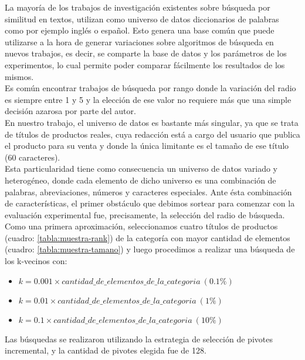 La mayor\'ia de los trabajos de investigaci\'on existentes sobre b\'usqueda por similitud en textos, utilizan como universo de datos diccionarios de palabras como por ejemplo ingl\'es o español. Esto genera una base com\'un que puede utilizarse a la hora de generar variaciones sobre algoritmos de b\'usqueda en nuevos trabajos, es decir, se comparte la base de datos y los par\'ametros de los experimentos, lo cual permite poder comparar f\'acilmente los resultados de los mismos.\\
 
Es com\'un encontrar trabajos de b\'usqueda por rango donde la variaci\'on del radio es siempre entre 1 y 5 y la elecci\'on de ese valor no requiere m\'as que una simple decisi\'on azarosa por parte del autor.\\

En nuestro trabajo, el universo de datos es bastante m\'as singular, ya que se trata de t\'itulos de productos reales, cuya redacci\'on est\'a a cargo del usuario que publica el producto para su venta y donde la \'unica limitante es el tama\~no de ese t\'itulo (60 caracteres).\\

Esta particularidad tiene como consecuencia un universo de datos variado y heterog\'eneo, donde cada elemento de dicho universo es una combinaci\'on de palabras, abreviaciones, n\'umeros y caracteres especiales. Ante \'esta combinaci\'on de caracter\'isticas, el primer obst\'aculo que debimos sortear para comenzar con la evaluaci\'on experimental fue, precisamente, la selecci\'on del radio de b\'usqueda.\\

Como una primera aproximaci\'on, seleccionamos cuatro t\'itulos de productos (cuadro: \ref{tabla:muestra-rank}) de la categor\'ia con mayor cantidad de elementos (cuadro: \ref{tabla:muestra-tamano}) y luego procedimos a realizar una b\'usqueda de los k-vecinos con:

\begin{itemize}
\item $k= 0.001 \times  cantidad\_de\_elementos\_de\_la\_categoria\ (0.1\%)$
\item $k= 0.01 \times cantidad\_de\_elementos\_de\_la\_categoria\ (1\%)$
\item $k= 0.1 \times cantidad\_de\_elementos\_de\_la\_categoria\ (10\%)$
\end{itemize}

Las b\'usquedas se realizaron utilizando la estrategia de selecci\'on de pivotes incremental, y la cantidad de pivotes elegida fue de 128.

